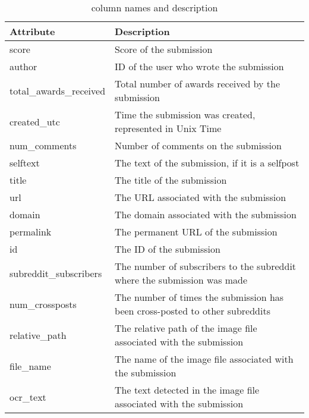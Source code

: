 \documentclass[11pt,a4paper]{article}
\begin{document}
\begin{table*}[h]
  \centering
  \begin{tabular}{|l|l|}
    \hline
    \textbf{Attribute} & \textbf{Description}\\
    \hline
    \rowcolor[gray]{0.9} score & Score of the submission\\
    \hline
    author & ID of the user who wrote the submission  \\
    \hline
    \rowcolor[gray]{0.9} total\_awards\_received & Total number of awards received by the submission\\
    \hline
    created\_utc & Time the submission was created, represented in Unix Time\\
    \hline
    \rowcolor[gray]{0.9} num\_comments & Number of comments on the submission \\
    \hline
    selftext & The text of the submission, if it is a selfpost \\
    \hline
    \rowcolor[gray]{0.9} title & The title of the submission \\
    \hline
    url & The URL associated with the submission \\ 
    \hline
    \rowcolor[gray]{0.9} domain & The domain associated with the submission \\
    \hline
    permalink & The permanent URL of the submission \\ 
    \hline
    \rowcolor[gray]{0.9} id & The ID of the submission \\ 
    \hline
    subreddit\_subscribers & The number of subscribers to the subreddit where the submission was made \\ \hline
    \rowcolor[gray]{0.9} num\_crossposts & The number of times the submission has been cross-posted to other subreddits \\ 
    \hline
    relative\_path & The relative path of the image file associated with the submission \\ 
    \hline
    \rowcolor[gray]{0.9} file\_name & The name of the image file associated with the submission \\ 
    \hline
    ocr\_text & The text detected in the image file associated with the submission \\ 
    \hline
  \end{tabular}
  \caption{column names and description}
  \label{tab:columns}
\end{table*}
\end{document}
